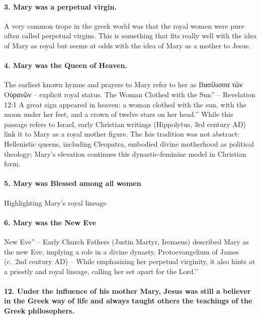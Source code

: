 \paragraph{3.
Mary was a perpetual virgin.}\label{par:mary-was-a-perpetual-virgin.}
A very common trope in the greek world was that the royal women were pure often called perpetual virgins.
This is something that fits really well with the idea of Mary as royal but seems at odds with the idea of Mary as a mother to Jesus.
\paragraph{4.
Mary was the Queen of Heaven.}\label{par:mary-was-the-queen-of-heaven.}
The earliest known hymns and prayers to Mary refer to her as Βασίλισσα τῶν Οὐρανῶν – explicit royal status.
The Woman Clothed with the Sun'' -- Revelation 12:1 A great sign appeared in heaven: a woman clothed with the sun, with the moon under her feet, and a crown of twelve stars on her head.’’ While this passage refers to Israel, early Christian writings (Hippolytus, 3rd century AD) link it to Mary as a royal mother figure. The Isis tradition was not abstract: Hellenistic queens, including Cleopatra, embodied divine motherhood as political theology; Mary’s elevation continues this dynastic-feminine model in Christian form.
\paragraph{5.
Mary was Blessed among all women}\label{par:mary-was-blessed-among-all-women}
Highlighting Mary’s royal lineage
\paragraph{6.
Mary was the New Eve}\label{par:mary-was-the-new-eve}
New Eve'' -- Early Church Fathers (Justin Martyr, Irenaeus) described Mary as the new Eve, implying a role in a divine dynasty. Protoevangelium of James (c.~2nd century AD) -- While emphasizing her perpetual virginity, it also hints at a priestly and royal lineage, calling her set apart for the Lord.’’

\paragraph{12.
Under the influence of his mother Mary, Jesus was still a believer in the Greek way of life and always taught others the teachings of the Greek philosophers.}\label{par:under-the-influence-of-his-mother-mary-jesus-was-still-a-believer-in-the-greek-way-of-life-and-always-taught-others-the-teachings-of-the-greek-philosophers.}

